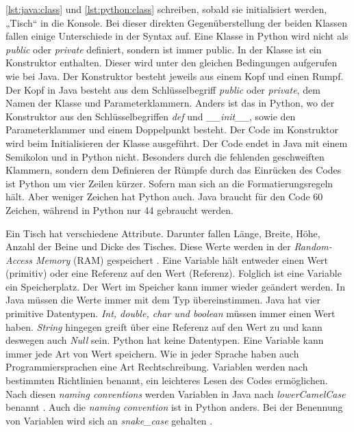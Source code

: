 \ref{lst:java:class} und \ref{lst:python:class} schreiben, sobald sie initialisiert werden, „Tisch“ in die Konsole. Bei dieser direkten Gegenüberstellung der beiden Klassen fallen einige Unterschiede in der Syntax auf. Eine Klasse in Python wird nicht als \textit{public} oder \textit{private} definiert, sondern ist immer public. In der Klasse ist ein Konstruktor enthalten. Dieser wird unter den gleichen Bedingungen aufgerufen wie bei Java. Der Konstruktor besteht jeweils aus einem Kopf und einen Rumpf. Der Kopf in Java besteht aus dem Schlüsselbegriff \textit{public} oder \textit{private}, dem Namen der Klasse und Parameterklammern. Anders ist das in Python, wo der Konstruktor aus den Schlüsselbegriffen \textit{def} und \textit{\_\_init\_\_}, sowie den Parameterklammer und einem Doppelpunkt besteht. Der Code im Konstruktor wird beim Initialisieren der Klasse ausgeführt. Der Code endet in Java mit einem Semikolon und in Python nicht. Besonders durch die fehlenden geschweiften Klammern, sondern dem Definieren der Rümpfe durch das Einrücken des Codes ist Python um vier Zeilen kürzer. Sofern man sich an die Formatierungsregeln hält. Aber weniger Zeichen hat Python auch. Java braucht für den Code 60 Zeichen, während in Python nur 44 gebraucht werden. \par

Ein Tisch hat verschiedene Attribute. Darunter fallen Länge, Breite, Höhe, Anzahl der Beine und Dicke des Tisches. Diese Werte werden in der \textit{Random-Access Memory} (RAM) gespeichert \cite{Louis:2010}. Eine Variable hält entweder einen Wert (primitiv) oder eine Referenz auf den Wert (Referenz). Folglich ist eine Variable ein Speicherplatz. Der Wert im Speicher kann immer wieder geändert werden. In Java müssen die Werte immer mit dem Typ übereinstimmen. Java hat vier primitive Datentypen. \textit{Int, double, char und boolean} müssen immer einen Wert haben. \textit{String} hingegen greift über eine Referenz auf den Wert zu und kann deswegen auch \textit{Null} sein. Python hat keine Datentypen. Eine Variable kann immer jede Art von Wert speichern. Wie in jeder Sprache haben auch Programmiersprachen eine Art Rechtschreibung. Variablen werden nach bestimmten Richtlinien benannt, ein leichteres Lesen des Codes ermöglichen. Nach diesen \textit{naming conventions} werden Variablen in Java nach \textit{lowerCamelCase} benannt \cite{Microsoft:CapCon}. Auch die \textit{naming convention} ist in Python anders. Bei der Benennung von Variablen wird sich an \textit{snake\_case} gehalten \cite{Ims:h-s}. \cite{JavaNC}\cite{PythonStyle}\cite{JVMS}

